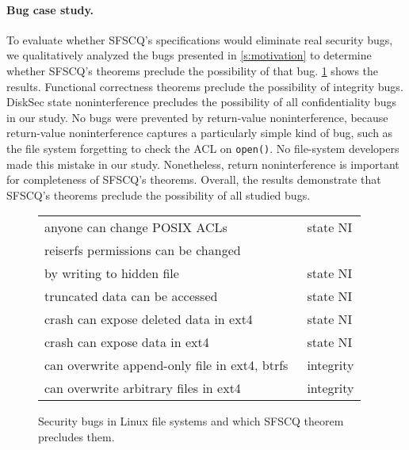 \paragraph{Bug case study.}

To evaluate whether SFSCQ's specifications would eliminate real
security bugs, we qualitatively analyzed the bugs presented in
\ref{s:motivation} to determine whether SFSCQ's theorems preclude
the possibility of that bug.  \ref{fig:bugs-addressed} shows the
results.  Functional correctness theorems preclude the possibility of
integrity bugs.  DiskSec state noninterference precludes the possibility
of all confidentiality bugs in our study.  No bugs were prevented by
return-value noninterference, because return-value noninterference captures a
particularly simple kind of bug, such as the file system forgetting
to check the ACL on \texttt{open()}.  No file-system developers made this
mistake in our study.  Nonetheless, return noninterference is important
for completeness of SFSCQ's theorems.  Overall, the results demonstrate
that SFSCQ's theorems preclude the possibility of all studied bugs.

\begin{figure}[ht]
  \centering
  \small
  \begin{tabular}{@{}p{2.4in}p{0.5in}@{}}
    anyone can change POSIX ACLs~\cite{CVE-2010-2071, CVE-2010-1641, CVE-2016-1237} & state NI \\
    reiserfs permissions can be changed \\ \quad by writing to hidden file~\cite{CVE-2010-1146} & state NI \\
    truncated data can be accessed~\cite{CVE-2015-8374}
                         & state NI \\
    crash can expose deleted data in ext4~\cite{CVE-2017-7495} & state NI \\
    crash can expose data in ext4~\cite{git:469017} & state NI \\
    can overwrite append-only file in ext4, btrfs~\cite{CVE-2010-2066, CVE-2010-2537} & integrity \\
    can overwrite arbitrary files in ext4~\cite{CVE-2009-4131} & integrity \\
  \end{tabular}
  \caption{Security bugs in Linux file systems and which SFSCQ theorem precludes them.}
  \label{fig:bugs-addressed}
\end{figure}


